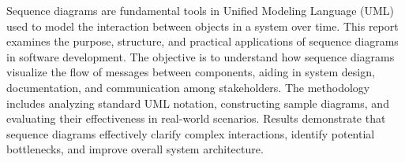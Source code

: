 Sequence diagrams are fundamental tools in Unified Modeling Language (UML) used to model the interaction between objects in a system over time. This report examines the purpose, structure, and practical applications of sequence diagrams in software development. The objective is to understand how sequence diagrams visualize the flow of messages between components, aiding in system design, documentation, and communication among stakeholders. The methodology includes analyzing standard UML notation, constructing sample diagrams, and evaluating their effectiveness in real-world scenarios. Results demonstrate that sequence diagrams effectively clarify complex interactions, identify potential bottlenecks, and improve overall system architecture.
\endinput
